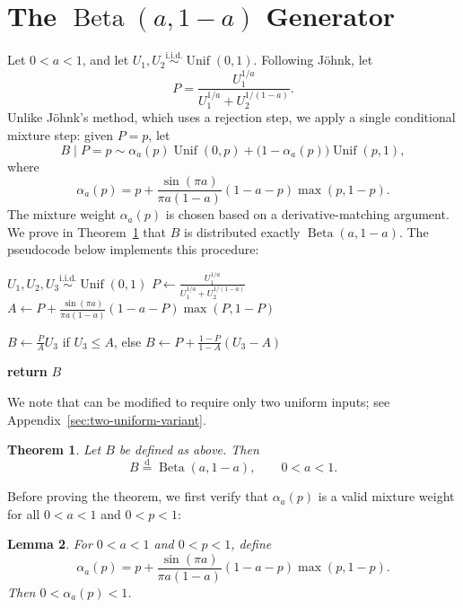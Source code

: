 \documentclass[11pt]{article}
\theoremstyle{plain}
\newtheorem{theorem}{Theorem}
\newtheorem{lemma}[theorem]{Lemma}
\theoremstyle{remark}
\newcommand{\eqdist}{\mathrel{\overset{\mathrm{d}}{=}}}
\begin{document}
\section{The \texorpdfstring{$\operatorname{Beta}(a,1-a)$}{Beta(a,1-a)} Generator}
\label{sec:algorithm}
Let $0<a<1$, and let $U_1,U_2 \overset{\mathrm{i.i.d.}}{\sim} \operatorname{Unif}(0,1)$.
Following J{\"o}hnk, let
\[
  P = \frac{U_1^{1/a}}{U_1^{1/a}+U_2^{1/(1-a)}}.
\]
Unlike J{\"o}hnk's method, which uses a rejection step, we apply a single conditional mixture step: given $P=p$, let
\begin{equation}
  B \mid P=p \sim \alpha_a(p)\operatorname{Unif}(0,p)
  + \bigl(1-\alpha_a(p)\bigr)\operatorname{Unif}(p,1),
\label{eq:mixture-def}
\end{equation}
where 
\begin{equation}
  \alpha_a(p) = p + \frac{\sin(\pi a)}{\pi a(1-a)}(1-a-p)\max(p,1-p).
\label{eq:alpha-def}
\end{equation}
The mixture weight $\alpha_a(p)$ is chosen based on a derivative-matching argument.
We prove in Theorem~\ref{thm:beta-law} that $B$ is distributed exactly $\operatorname{Beta}(a,1-a)$.
The pseudocode below implements this procedure:
\begin{algorithm}[H]
  \caption{\texorpdfstring{$\operatorname{Beta}(a,1-a)$}{Beta(a,1-a)} generator, parameter $0<a<1$}
  \label{alg:beta-core}
  \begin{algorithmic}[1]
    \State $U_1,U_2,U_3 \overset{\mathrm{i.i.d.}}{\sim} \operatorname{Unif}(0,1)$
    \State $P \gets \frac{U_1^{1/a}}{U_1^{1/a}+U_2^{1/(1-a)}}$
    \State $A \gets P + \frac{\sin(\pi a)}{\pi a(1-a)}(1-a-P)\max(P,1-P)$ 
    \State \parbox[t]{0.82\linewidth}{$B \gets \frac{P}{A}U_3$ if $U_3 \le A$, else $B \gets P + \frac{1-P}{1-A}(U_3-A)$}
    \State \textbf{return} $B$
  \end{algorithmic}
\end{algorithm}
We note that  can be modified to require only two uniform inputs; see Appendix~\ref{sec:two-uniform-variant}.

\begin{theorem}
\label{thm:beta-law}
Let $B$ be defined as above. Then
\[
  B \eqdist \operatorname{Beta}(a,1-a), \qquad 0<a<1.
\]
\end{theorem}
Before proving the theorem, we first verify that $\alpha_a(p)$ is a valid mixture weight for all $0<a<1$ and $0<p<1$:
\begin{lemma}
\label{lem:alpha-bounds}
For $0<a<1$ and $0<p<1$, define
\[
  \alpha_a(p) = p + \dfrac{\sin(\pi a)}{\pi a(1-a)}(1-a-p)\max(p,1-p).
\]
Then $0 < \alpha_a(p) < 1$.
\end{lemma}
\end{document}
